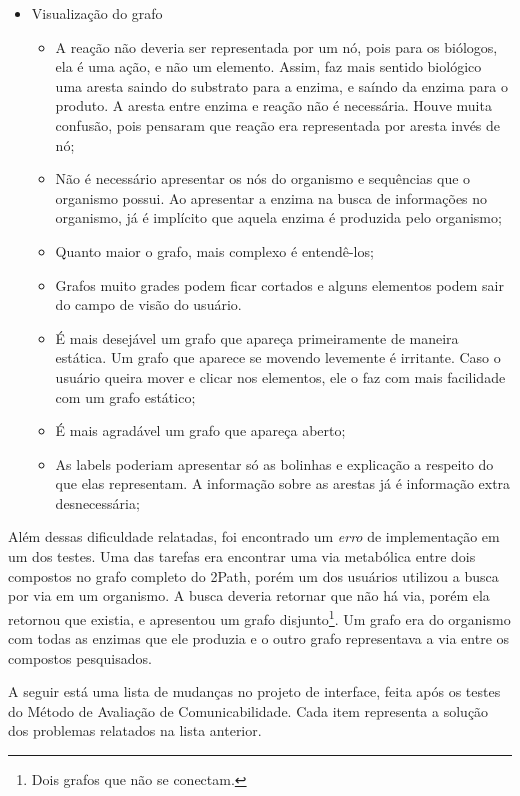 \begin{itemize}
\item Visualização do grafo
  \begin{itemize}
  \item[1] A reação não deveria ser representada por um nó, pois para os biólogos, ela é uma ação, e não um elemento. Assim, faz mais sentido biológico uma aresta saindo do substrato para a enzima, e saíndo da enzima para o produto. A aresta entre enzima e reação não é necessária. Houve muita confusão, pois pensaram que reação era representada por aresta invés de nó;
  \item[2] Não é necessário apresentar os nós do organismo e sequências que o organismo possui. Ao apresentar a enzima na busca de informações no organismo, já é implícito que aquela enzima é produzida pelo organismo;
  \item[3] Quanto maior o grafo, mais complexo é entendê-los;
  \item[4] Grafos muito grades podem ficar cortados e alguns elementos podem sair do campo de visão do usuário.
  \item[5] É mais desejável um grafo que apareça primeiramente de maneira estática. Um grafo que aparece se movendo levemente é irritante. Caso o usuário queira mover e clicar nos elementos, ele o faz com mais facilidade com um grafo estático;
  \item[6] É mais agradável um grafo que apareça aberto;
  \item[7] As labels poderiam apresentar só as bolinhas e explicação a respeito do que elas representam. A informação sobre as arestas já é informação extra desnecessária;
  \end{itemize}
\end{itemize}


\indent Além dessas dificuldade relatadas, foi encontrado um \textit{erro} de implementação em um dos testes. Uma das tarefas era encontrar uma via metabólica entre dois compostos no grafo completo do 2Path, porém um dos usuários utilizou a busca por via em um organismo. A busca deveria retornar que não há via, porém ela retornou que existia, e apresentou um grafo disjunto\footnote{Dois grafos que não se conectam.}. Um grafo era do organismo com todas as enzimas que ele produzia e o outro grafo representava a via entre os compostos pesquisados.

\indent A seguir está uma lista de mudanças no projeto de interface, feita após os testes do Método de Avaliação de Comunicabilidade. Cada item representa a solução dos problemas relatados na lista anterior.

